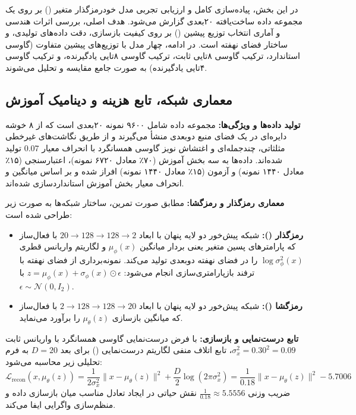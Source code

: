 \label{sec:question2}

در این بخش، پیاده‌سازی کامل و ارزیابی تجربی مدل خودرمزگذار متغیر () بر روی یک مجموعه داده ساخت‌یافته ۲۰‌بعدی گزارش می‌شود. هدف اصلی، بررسی اثرات هندسی و آماری انتخاب توزیع پیشین () بر روی کیفیت بازسازی، دقت داده‌های تولیدی، و ساختار فضای نهفته است. در ادامه، چهار مدل با توزیع‌های پیشین متفاوت (گاوسی استاندارد، ترکیب گاوسی ۸‌تایی ثابت، ترکیب گاوسی ۸‌تایی یادگیرنده، و ترکیب گاوسی ۴‌تایی یادگیرنده) به صورت جامع مقایسه و تحلیل می‌شوند.

\subsection{معماری شبکه، تابع هزینه و دینامیک آموزش}
\label{sec:q2-arch}

\textbf{تولید داده‌ها و ویژگی‌ها:} مجموعه داده شامل ۹۶۰۰ نمونه ۲۰‌بعدی است که از ۸ خوشه دایره‌ای در یک فضای منبع دوبعدی منشأ می‌گیرند و از طریق نگاشت‌های غیرخطی مثلثاتی، چندجمله‌ای و اغتشاش نویز گاوسی همسانگرد با انحراف معیار $0.07$ تولید شده‌اند. داده‌ها به سه بخش آموزش (۷۰٪ معادل ۶۷۲۰ نمونه)، اعتبارسنجی (۱۵٪ معادل ۱۴۴۰ نمونه) و آزمون (۱۵٪ معادل ۱۴۴۰ نمونه) افراز شده و بر اساس میانگین و انحراف معیار بخش آموزش استانداردسازی شده‌اند.

\textbf{معماری رمزگذار و رمزگشا:} مطابق صورت تمرین، ساختار شبکه‌ها به صورت زیر طراحی شده است:
\begin{itemize}
  \item \textbf{رمزگذار ():} شبکه پیش‌خور دو لایه پنهان با ابعاد $20 \to 128 \to 128 \to 2$ با فعال‌ساز  که پارامترهای پسین متغیر یعنی بردار میانگین $\mu_\phi(x)$ و لگاریتم واریانس قطری $\log\sigma_\phi^2(x)$ را در فضای نهفته دوبعدی تولید می‌کند. نمونه‌برداری از فضای نهفته با ترفند بازپارامتری‌سازی انجام می‌شود: $z = \mu_\phi(x) + \sigma_\phi(x) \odot \epsilon$ با $\epsilon \sim \mathcal{N}(0, I_2)$.
  \item \textbf{رمزگشا ():} شبکه پیش‌خور دو لایه پنهان با ابعاد $2 \to 128 \to 128 \to 20$ با فعال‌ساز  که میانگین بازسازی $\mu_\theta(z)$ را برآورد می‌نماید.
\end{itemize}

\textbf{تابع درست‌نمایی و بازسازی:} با فرض درست‌نمایی گاوسی همسانگرد با واریانس ثابت $\sigma_x^2 = 0.30^2 = 0.09$، تابع اتلاف منفی لگاریتم درست‌نمایی () برای بعد $D=20$ به فرم تحلیلی زیر محاسبه می‌شود:
\begin{equation}
  \mathcal{L}_{\text{recon}}(x, \mu_\theta(z)) = \frac{1}{2\sigma_x^2} \|x - \mu_\theta(z)\|^2 + \frac{D}{2}\log(2\pi\sigma_x^2) = \frac{1}{0.18} \|x - \mu_\theta(z)\|^2 - 5.7006
  \label{eq:recon-nll}
\end{equation}
ضریب وزنی $\frac{1}{0.18} \approx 5.5556$ نقش حیاتی در ایجاد تعادل مناسب میان بازسازی داده و منظم‌سازی واگرایی  ایفا می‌کند.

